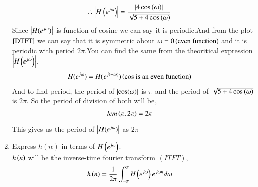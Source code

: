 \documentclass[journal,12pt,twocolumn]{IEEEtran}
\renewcommand\thesection{\arabic{section}}
\begin{document}
\begin{enumerate}[label=\thesection.\arabic*]
\begin{align}
        \therefore \left\vert H\left(e^{j \omega}\right)\right\vert &= \frac{\left\vert4\cos\left(\omega\right)\right\vert}{\sqrt{5 +4\cos\left(\omega\right)}}
     \end{align}
Since $\left\vert H(e^{j\omega})\right\vert$ is function of cosine we can say it is periodic.And from the plot $\ref{DTFT}$ we can say that it is symmetric about $\omega = 0\left(\text{even function}\right)$ and it is periodic with period $2\pi$.You can find the same from the theoritical expression $\left\vert H\left(e^{j \omega}\right)\right\vert$, 
       \begin{align}
         H(e^{j\omega}) &= H(e^{j(-\omega)})\left(\text{cos is an even function}\right)
       \end{align}
    And to find period, the period of $\left\vert\cos(\omega)\right\vert$ is $\pi$ and the period of $\sqrt{5 + 4\cos\left(\omega\right)}$ is $2\pi$. So the period of division of both will be,
     \begin{align}
      lcm\left(\pi,2\pi\right) &= 2\pi
     \end{align}
     This gives us the period of $\left\vert H(e^{j\omega})\right\vert$ as $2\pi$
  \item Express $h(n)$ in terms of $H\left(e^{j \omega}\right)$.\\
     \solution $h\left(n\right)$ will be the inverse-time fourier transform $(ITFT)$,
      \begin{align}
        h\left(n\right) &= \frac{1}{2\pi}\int_{-\pi}^{\pi}H\left(e^{j\omega}\right)e^{j\omega n}d\omega
      \end{align} 

    \end{enumerate}
\end{document}
